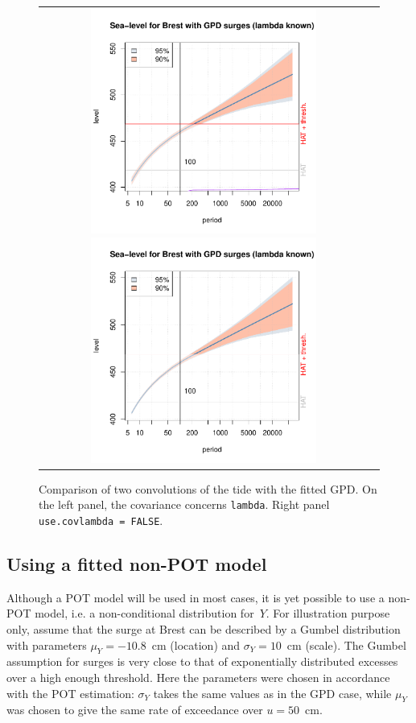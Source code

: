 \documentclass[11pt,a4paper]{report}\usepackage[]{graphicx}\usepackage[]{color}
\begin{document}
\begin{figure}
   \centering
   \begin{tabular}{c c} 
     \includegraphics[width=7.4cm]{Rgraphics/figBrestConv15-1.pdf} 
     \includegraphics[width=7.4cm]{Rgraphics/figBrestConv2-1.pdf}  
   \end{tabular}
   \caption{\label{BrestSurge2} Comparison of two convolutions of the
     tide with the fitted GPD.  On the left panel, the covariance
     concerns \texttt{lambda}. Right panel \texttt{use.covlambda =
       FALSE}. }
\end{figure}

\subsection{Using a fitted non-POT model}
\label{NONPOT}
Although a POT model will be used in most cases, it is yet possible to
use a non-POT model, i.e.  a non-conditional distribution for~$Y$.
For illustration purpose only, assume that the surge at Brest can be
described by a Gumbel  distribution with
parameters $\mu_Y=-10.8$~cm (location) and $\sigma_Y= 10$~cm (scale).  The
Gumbel assumption for surges is very close to that of exponentially
distributed excesses over a high enough threshold. Here the
parameters were chosen in accordance with the POT estimation: $\sigma_Y$
takes the same values as in the GPD case, while $\mu_Y$ was chosen to
give the same rate of exceedance over $u = 50$~\textrm{cm}.  
\end{document}
